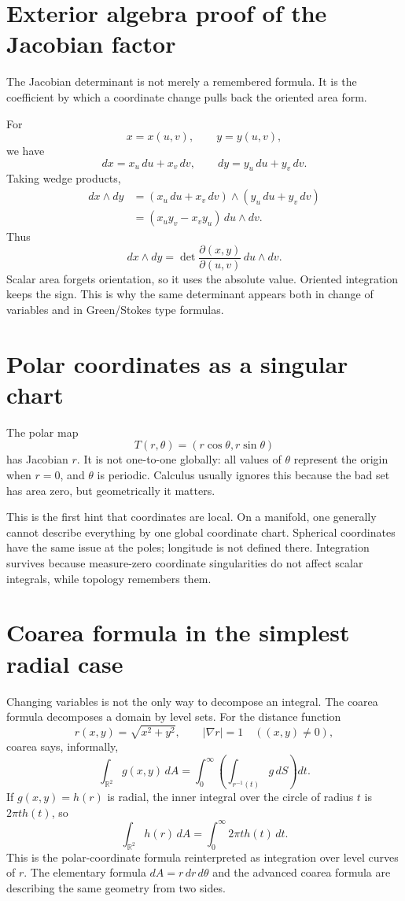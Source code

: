 \section{Exterior algebra proof of the Jacobian factor}

The Jacobian determinant is not merely a remembered formula.  It is the coefficient by which a coordinate change pulls back the oriented area form.

For
\[
  x=x(u,v),\qquad y=y(u,v),
\]
we have
\[
  dx=x_u\,du+x_v\,dv,\qquad
  dy=y_u\,du+y_v\,dv.
\]
Taking wedge products,
\[
\begin{aligned}
  dx\wedge dy
  &=(x_u\,du+x_v\,dv)\wedge(y_u\,du+y_v\,dv)\\
  &=(x_u y_v-x_vy_u)\,du\wedge dv.
\end{aligned}
\]
Thus
\[
  dx\wedge dy=\det\frac{\partial(x,y)}{\partial(u,v)}\,du\wedge dv.
\]
Scalar area forgets orientation, so it uses the absolute value.  Oriented integration keeps the sign.  This is why the same determinant appears both in change of variables and in Green/Stokes type formulas.

\section{Polar coordinates as a singular chart}

The polar map
\[
  T(r,\theta)=(r\cos\theta,r\sin\theta)
\]
has Jacobian \(r\).  It is not one-to-one globally: all values of \(\theta\) represent the origin when \(r=0\), and \(\theta\) is periodic.  Calculus usually ignores this because the bad set has area zero, but geometrically it matters.

This is the first hint that coordinates are local.  On a manifold, one generally cannot describe everything by one global coordinate chart.  Spherical coordinates have the same issue at the poles; longitude is not defined there.  Integration survives because measure-zero coordinate singularities do not affect scalar integrals, while topology remembers them.

\section{Coarea formula in the simplest radial case}

Changing variables is not the only way to decompose an integral.  The coarea formula decomposes a domain by level sets.  For the distance function
\[
  r(x,y)=\sqrt{x^2+y^2},\qquad |\nabla r|=1\quad((x,y)\ne0),
\]
coarea says, informally,
\[
  \int_{\mathbb R^2} g(x,y)\,dA
  =\int_0^\infty \left(\int_{r^{-1}(t)} g\,dS\right)dt.
\]
If \(g(x,y)=h(r)\) is radial, the inner integral over the circle of radius \(t\) is \(2\pi t h(t)\), so
\[
  \int_{\mathbb R^2} h(r)\,dA
  =\int_0^\infty 2\pi t h(t)\,dt.
\]
This is the polar-coordinate formula reinterpreted as integration over level curves of \(r\).  The elementary formula \(dA=r\,dr\,d\theta\) and the advanced coarea formula are describing the same geometry from two sides.

